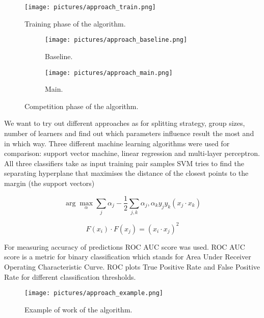 \documentclass{scrartcl}
\begin{document}
\begin{figure}[H]
  \begin{center}
    \texttt{[image: pictures/approach\_train.png]}
  \end{center}
  \caption{Training phase of the algorithm.}
  \label{fig:approach_train}
\end{figure}
\begin{figure}[H]
  \centering
  \begin{subfigure}[b]{0.45\linewidth}
    \texttt{[image: pictures/approach\_baseline.png]}
    \caption{Baseline.}
  \end{subfigure}\hfill%
  \begin{subfigure}[b]{0.45\linewidth}
    \texttt{[image: pictures/approach\_main.png]}
    \caption{Main.}
  \end{subfigure}
  \caption{Competition phase of the algorithm.}
  \label{fig:approach}
\end{figure}

We want to try out different approaches as for splitting strategy, group sizes, number of learners and find out which parameters influence result the most and in which way.
Three different machine learning algorithms were used for comparison: support vector machine, linear regression and multi-layer perceptron. 
All three classifiers take as input training pair samples 
SVM 
tries to find the separating hyperplane that maximises the distance of the closest points to the margin (the support vectors)


\begin{equation}
\arg\max_\alpha \sum_j \alpha_j - \frac{1}{2} \sum_{j,k} \alpha_j, \alpha_k y_j y_k (x_j \cdot x_k)
\label{eqn:svm:maxmarg}
\end{equation}

\begin{equation}
F(x_i) \cdot F(x_j) = (x_i \cdot x_j)^2
\end{equation}


For measuring accuracy of predictions ROC AUC score was used. ROC AUC score is a metric for binary classification which stands for Area Under Receiver Operating Characteristic Curve. ROC plots True Positive Rate and False Positive Rate for different classification thresholds. 



\begin{figure}[t]
  \texttt{[image: pictures/approach\_example.png]}
  \caption{Example of work of the algorithm.}
  \label{fig:approach_example}
\end{figure}
\end{document}
